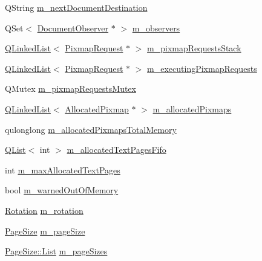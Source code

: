 \begin{DoxyCompactItemize}
\item 
Q\+String \hyperlink{classOkular_1_1DocumentPrivate_a0c531a03865395da325584dbae6e1efe}{m\+\_\+next\+Document\+Destination}
\item 
Q\+Set$<$ \hyperlink{classOkular_1_1DocumentObserver}{Document\+Observer} $\ast$ $>$ \hyperlink{classOkular_1_1DocumentPrivate_a604d83cdce56b4cab8d2bcccfc01fbfa}{m\+\_\+observers}
\item 
\hyperlink{classQLinkedList}{Q\+Linked\+List}$<$ \hyperlink{classOkular_1_1PixmapRequest}{Pixmap\+Request} $\ast$ $>$ \hyperlink{classOkular_1_1DocumentPrivate_af903e531960617af53b4bc79b3a95efa}{m\+\_\+pixmap\+Requests\+Stack}
\item 
\hyperlink{classQLinkedList}{Q\+Linked\+List}$<$ \hyperlink{classOkular_1_1PixmapRequest}{Pixmap\+Request} $\ast$ $>$ \hyperlink{classOkular_1_1DocumentPrivate_adc84c2f8f76e7880b41e155edabf69e7}{m\+\_\+executing\+Pixmap\+Requests}
\item 
Q\+Mutex \hyperlink{classOkular_1_1DocumentPrivate_a5c0e919d575a7a3c19a42c64a672fce4}{m\+\_\+pixmap\+Requests\+Mutex}
\item 
\hyperlink{classQLinkedList}{Q\+Linked\+List}$<$ \hyperlink{structAllocatedPixmap}{Allocated\+Pixmap} $\ast$ $>$ \hyperlink{classOkular_1_1DocumentPrivate_a13e55dcfc91cfbe1ff91a55312f3e39f}{m\+\_\+allocated\+Pixmaps}
\item 
qulonglong \hyperlink{classOkular_1_1DocumentPrivate_accbd72ead7fca72852b516f580d2abf1}{m\+\_\+allocated\+Pixmaps\+Total\+Memory}
\item 
\hyperlink{classQList}{Q\+List}$<$ int $>$ \hyperlink{classOkular_1_1DocumentPrivate_a2fb5e844b3870b8cff42a4c3b4bdfd48}{m\+\_\+allocated\+Text\+Pages\+Fifo}
\item 
int \hyperlink{classOkular_1_1DocumentPrivate_ad1a0b7d1cb235cc915a46d242a04e1dc}{m\+\_\+max\+Allocated\+Text\+Pages}
\item 
bool \hyperlink{classOkular_1_1DocumentPrivate_a0d88f3c05c3c5b7645c6a12fde948759}{m\+\_\+warned\+Out\+Of\+Memory}
\item 
\hyperlink{namespaceOkular_a8556d00465f61ef533c6b027669e7da6}{Rotation} \hyperlink{classOkular_1_1DocumentPrivate_a5b7f4c2b5937d311b277c2e90826ee1b}{m\+\_\+rotation}
\item 
\hyperlink{classOkular_1_1PageSize}{Page\+Size} \hyperlink{classOkular_1_1DocumentPrivate_a6c09eaaed5a1d862bb11074347cc102d}{m\+\_\+page\+Size}
\item 
\hyperlink{classOkular_1_1PageSize_a6c450ee7c579f47402a21588403ea0ab}{Page\+Size\+::\+List} \hyperlink{classOkular_1_1DocumentPrivate_a71f8c84e54d8cc8a5f3396f18c7dae7a}{m\+\_\+page\+Sizes}

\end{DoxyCompactItemize}
